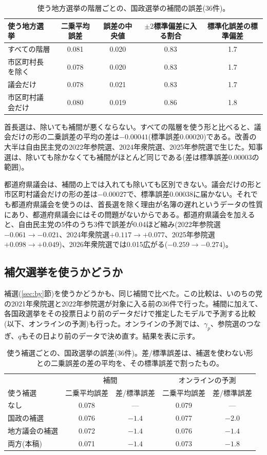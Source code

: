 \documentclass[a4paper,11pt]{ltjsarticle}
\begin{document}
\begin{table}[h]
\centering
\begin{tabular}{lcccc}
\hline
使う地方選挙 & 二乗平均誤差 & 誤差の中央値 & $\pm2$標準偏差に入る割合 & 標準化誤差の標準偏差 \\
\hline
すべての階層 & 0.081 & 0.020 & 0.83 & 1.7 \\
市区町村長を除く & 0.078 & 0.020 & 0.83 & 1.7 \\
議会だけ & 0.078 & 0.021 & 0.83 & 1.7 \\
市区町村議会だけ & 0.080 & 0.019 & 0.86 & 1.8 \\
\hline
\end{tabular}
\caption{使う地方選挙の階層ごとの、国政選挙の補間の誤差(36件)。}
\end{table}

首長選は、除いても補間が悪くならない。すべての階層を使う形と比べると、議会だけの形の二乗誤差の平均の差は$-0.00041$(標準誤差0.00020)である。改善の大半は自由民主党の2022年参院選、2024年衆院選、2025年参院選で生じた。知事選は、除いても除かなくても補間がほとんど同じである(差は標準誤差0.00003の範囲)。

都道府県議会は、補間の上では入れても除いても区別できない。議会だけの形と市区町村議会だけの形の差は$-0.00027$で、標準誤差0.00038に届かない。それでも都道府県議会を使うのは、首長選を除く理由が名簿の遅れというデータの性質にあり、都道府県議会にはその問題がないからである。都道府県議会を加えると、自由民主党の5件のうち3件で誤差が0.04ほど縮み(2022年参院選$-0.061\to-0.021$、2024年衆院選$+0.117\to+0.077$、2025年参院選$+0.098\to+0.049$)、2026年衆院選では0.015広がる($-0.259\to-0.274$)。

\subsection{補欠選挙を使うかどうか}
\label{sec:by_valid}

補選(\ref{sec:by}節)を使うかどうかも、同じ補間で比べた。この比較は、いのちの党の2021年衆院選と2022年参院選が対象に入る前の36件で行った。補間に加えて、各国政選挙をその投票日より前のデータだけで推定したモデルで予測する比較(以下、オンラインの予測)も行った。オンラインの予測では、$\gamma_p$、参院選のつなぎ、$q$もその日より前のデータで決め直す。結果を表に示す。

\begin{table}[h]
\centering
\begin{tabular}{lcccc}
\hline
 & \multicolumn{2}{c}{補間} & \multicolumn{2}{c}{オンラインの予測} \\
使う補選 & 二乗平均誤差 & 差/標準誤差 & 二乗平均誤差 & 差/標準誤差 \\
\hline
なし & 0.078 & --- & 0.079 & --- \\
国政の補選 & 0.076 & $-1.4$ & 0.077 & $-2.0$ \\
地方議会の補選 & 0.072 & $-1.4$ & 0.076 & $-1.4$ \\
両方(本稿) & 0.071 & $-1.4$ & 0.073 & $-1.8$ \\
\hline
\end{tabular}
\caption{使う補選ごとの、国政選挙の誤差(36件)。差/標準誤差は、補選を使わない形との二乗誤差の差の平均を、その標準誤差で割ったもの。}
\end{table}
\end{document}
